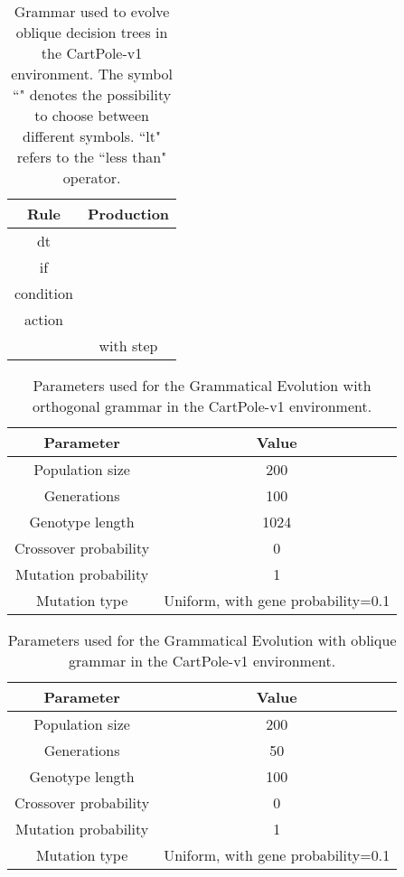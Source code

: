 \documentclass[review,english]{elsarticle}
\begin{document}
\begin{table}
    \centering
    \begin{tabular}{|c|c|} \hline
        \textbf{Rule} & \textbf{Production} \\ \hline
        dt &  \\ if &  \\ condition &  \\ action &  \\  &  with step  \\ \hline
    \end{tabular}
    \caption{Grammar used to evolve oblique decision trees in the CartPole-v1 environment. The symbol ``" denotes the possibility to choose between different symbols. ``lt" refers to the ``less than" operator.}
    \label{tab:cp_obl_grammar}
\end{table}

\begin{table}
    \centering
    \begin{tabular}{|c|c|} \hline
        \textbf{Parameter} & \textbf{Value} \\ \hline
        Population size & 200 \\ Generations & 100 \\ Genotype length & 1024 \\ Crossover probability & 0 \\ Mutation probability & 1 \\ Mutation type & Uniform, with gene probability=0.1 \\ \hline
    \end{tabular}
    \caption{Parameters used for the Grammatical Evolution with orthogonal grammar in the CartPole-v1 environment.}
    \label{tab:cp_ort_params_ge}
\end{table}

\begin{table}
    \centering
    \begin{tabular}{|c|c|} \hline
        \textbf{Parameter} & \textbf{Value} \\ \hline
        Population size & 200 \\ Generations & 50 \\ Genotype length & 100 \\ Crossover probability & 0 \\ Mutation probability & 1 \\ Mutation type & Uniform, with gene probability=0.1 \\ \hline
    \end{tabular}
    \caption{Parameters used for the Grammatical Evolution with oblique grammar in the CartPole-v1 environment.}
    \label{tab:cp_obl_params_ge}
\end{table}
\end{document}
